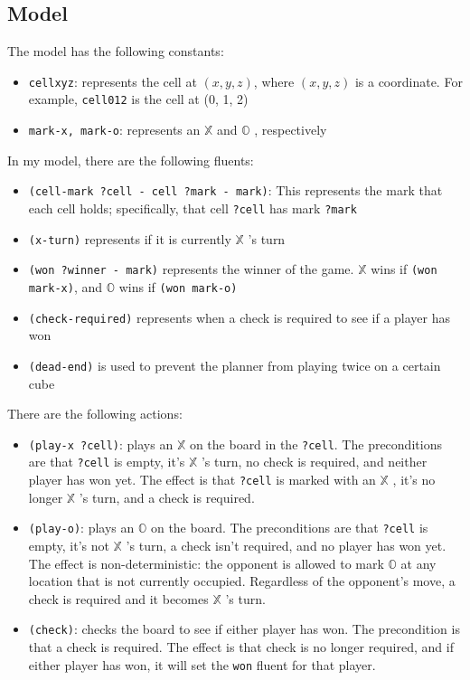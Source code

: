 \documentclass[11pt]{article}
\newcommand{\XX}{$\mathbb{X}$ }
\newcommand{\OO}{$\mathbb{O}$ }
\begin{document}
\subsection{Model}
The model has the following constants:
\begin{itemize}
    \item \texttt{cellxyz}: represents the cell at $(x, y, z)$, where $(x, y, z)$ is a coordinate. For example, \texttt{cell012} is the cell at (0, 1, 2)
    \item \texttt{mark-x, mark-o}: represents an \XX and \OO, respectively
\end{itemize}

\noindent In my model, there are the following fluents:
\begin{itemize}
    \item \texttt{(cell-mark ?cell - cell ?mark - mark)}: This represents the mark that each cell holds; specifically, that cell \texttt{?cell} has mark \texttt{?mark}
    \item \texttt{(x-turn)} represents if it is currently \XX's turn
    \item \texttt{(won ?winner - mark)} represents the winner of the game. \XX wins if \texttt{(won mark-x)}, and \OO wins if \texttt{(won mark-o)} 
    \item \texttt{(check-required)} represents when a check is required to see if a player has won
    \item \texttt{(dead-end)} is used to prevent the planner from playing twice on a certain cube
\end{itemize}

\noindent There are the following actions:
\begin{itemize}
    \item \texttt{(play-x ?cell)}: plays an \XX on the board in the \texttt{?cell}. The preconditions are that \texttt{?cell} is empty, it's \XX's turn, no check is required, and neither player has won yet. The effect is that \texttt{?cell} is marked with an \XX, it's no longer \XX's turn, and a check is required.
    \item \texttt{(play-o)}: plays an \OO on the board. The preconditions are that \texttt{?cell} is empty, it's not \XX's turn, a check isn't required, and no player has won yet. The effect is non-deterministic: the opponent is allowed to mark \OO at any location that is not currently occupied. Regardless of the opponent's move, a check is required and it becomes \XX's turn.
    \item \texttt{(check)}: checks the board to see if either player has won. The precondition is that a check is required. The effect is that check is no longer required, and if either player has won, it will set the \texttt{won} fluent for that player.
\end{itemize}
\end{document}
